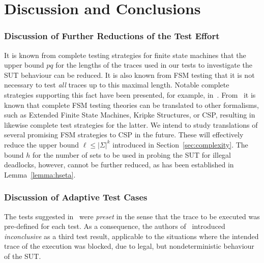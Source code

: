 \section{Discussion and Conclusions}
\label{sec:conc}

\subsubsection*{Discussion of Further Reductions of the Test Effort}
It is known from complete testing strategies for finite state machines that
the upper bound $pq$ for the lengths of the traces used in our tests to
investigate the SUT behaviour can be reduced. It is also known from FSM
testing that it is not necessary to test {\it all} traces up to this maximal
length. Notable complete strategies supporting this fact have been presented,
for example,
in~\cite{hierons_testing_2004,DBLP:conf/forte/DorofeevaEY05,petrenko_testing_2011,simao_reducing_2012}.
From~\cite{Huang2017} it is known that complete FSM testing theories can be
translated to other formalisms, such as Extended Finite State Machines,
Kripke Structures, or CSP, resulting in likewise complete test strategies for
the latter. We intend to study translations of several promising FSM
strategies to CSP in the future. These will effectively reduce the upper
bound $\ell\le |\Sigma|^k$ introduced in Section~\ref{sec:complexity}. The
bound $h$ for the number of sets to be used in probing the SUT for illegal
deadlocks, however, cannot be further reduced, as has been established in
Lemma~\ref{lemma:hseta}.

\subsubsection*{Discussion of Adaptive Test Cases}
The tests suggested
in~\cite{Hennessy:1988:ATP:50497,DBLP:conf/icfem/CavalcantiG07} were \emph{preset} in the
sense that the trace to be executed was pre-defined for each test. As a consequence,
the authors of~\cite{DBLP:conf/icfem/CavalcantiG07} introduced \emph{inconclusive}
as a third test result, applicable to the situations where the intended trace
of the execution was blocked, due to legal, but nondeterministic behaviour of the
SUT.

